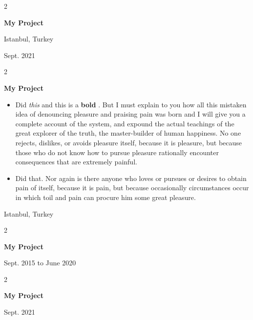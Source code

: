 \documentclass[10pt, letterpaper]{article}
\newenvironment{highlights}{
    \begin{itemize}[
        topsep=0.10 cm,
        parsep=0.10 cm,
        partopsep=0pt,
        itemsep=0pt,
        leftmargin=0.4 cm + 10pt
    ]
}{
    \end{itemize}
} %
\newenvironment{twocolentry}[2][]{
    \onecolentry
    \def\secondColumn{#2}
    \setcolumnwidth{\fill, 4.5 cm}
    \begin{paracol}{2}
}{
    \switchcolumn \raggedleft \secondColumn
    \end{paracol}
    \endonecolentry
} %
\let\hrefWithoutArrow\href
\renewcommand{\href}[2]{\hrefWithoutArrow{#1}{\mbox{\ifthenelse{\equal{#2}{}}{ }{#2 }\raisebox{.15ex}{\footnotesize \faExternalLink*}}}}
\begin{document}
        \vspace{0.2 cm}

        \begin{twocolentry}{
            Istanbul, Turkey

        Sept. 2021
        }
            \textbf{My Project}
        \end{twocolentry}


        \vspace{0.2 cm}

        \begin{twocolentry}{
            Istanbul, Turkey
        }
            \textbf{My Project}
            \begin{highlights}
                \item Did \textit{this} and this is a \textbf{bold} \href{https://example.com}{link}. But I must explain to you how all this mistaken idea of denouncing pleasure and praising pain was born and I will give you a complete account of the system, and expound the actual teachings of the great explorer of the truth, the master-builder of human happiness. No one rejects, dislikes, or avoids pleasure itself, because it is pleasure, but because those who do not know how to pursue pleasure rationally encounter consequences that are extremely painful.
                \item Did that. Nor again is there anyone who loves or pursues or desires to obtain pain of itself, because it is pain, but because occasionally circumstances occur in which toil and pain can procure him some great pleasure.
            \end{highlights}
        \end{twocolentry}


        \vspace{0.2 cm}

        \begin{twocolentry}{
            Sept. 2015 to June 2020
        }
            \textbf{My Project}
        \end{twocolentry}


        \vspace{0.2 cm}

        \begin{twocolentry}{
            Sept. 2021
        }
            \textbf{My Project}
        \end{twocolentry}


        \vspace{0.2 cm}
\end{document}
